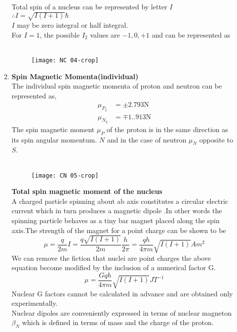 \begin{enumerate}
\begin{enumerate}
Total spin of a nucleus can be represented by letter $I$\\
$\therefore I=\sqrt{I(I+1)}\hbar$\\
$I$ may be zero integral or half integral.\\
 For $I=1$, the possible $I_2$ values are $-1,0,+1$ and can be represented as \\\\
\begin{figure}[H]
	\centering
	\texttt{[image: NC 04-crop]}
	\caption{}
	\label{}
\end{figure}
	\item \textbf{Spin Magnetic Momenta(individual)}\\
	 The individual spin magnetic momenta of proton and neutron can be represented as,\\
	\begin{align*}
	\mu_{P_{2}}&=\pm 2.793 \mathrm{N}\\
	\mu_{N_{2}}&=\mp 1..913 \mathrm{N}
	\end{align*}
	The spin magnetic moment $\mu_P$ of the proton is in the same direction as its spin angular momentum. $N$ and in the case of neutron $\mu_{N}$ opposite to $S$.\\\\
	\begin{figure}[H]
		\centering
		\texttt{[image: CN 05-crop]}
		\caption{}
		\label{}
	\end{figure}
\textbf{Total spin magnetic moment of the nucleus}\\
A charged particle spinning about ab axis constitutes a circular electric current which in turn produces a magnetic dipole .In other words the spinning particle behaves as a tiny bar magnet placed along the spin axis.The strength of the magnet for a point charge can be shown to be \\
$$\mu=\frac{q}{2m}I=\frac{q\sqrt{I(I+1)}}{2m}\frac{h}{2\pi}=\frac{qh}{4\pi m}\sqrt{I(I+1)}Am^2$$
We can remove the fiction that nuclei are point charges the above equation become modified by the inclusion of a numerical factor G.\\
$$\mu=\frac{Gqh}{4 \pi m}\sqrt{I(I+1)}JT^{-1}$$
Nuclear G factors cannot be calculated in advance and are obtained only experimentally.\\
Nuclear dipoles are conveniently expressed in terms of nuclear magneton $\beta_N$ which is defined in terms of mass and the charge of the proton.\\

\end{enumerate}
\end{enumerate}
